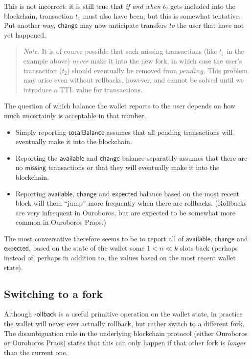 \documentclass{article}
\begin{document}
This is not incorrect: it is still true that \emph{if and when} $t_2$ gets
included into the blockchain, transaction $t_1$ must also have been; but this is
somewhat tentative. Put another way, $\mathsf{change}$ may now anticipate
transfers \emph{to} the user that have not yet happened.

\begin{quote} \emph{Note.}
It is of course possible that such missing transactions (like $t_1$ in the
example above) \emph{never} make it into the new fork, in which case the user's
transaction ($t_2$) should eventually be removed from $\mathit{pending}$. This
problem may arise even without rollbacks, however, and cannot be solved until we
introduce a TTL value for transactions.
\end{quote}

The question of which balance the wallet reports to the user depends on how
much uncertainly is acceptable in that number.

\begin{itemize}
\item Simply reporting $\mathsf{totalBalance}$ assumes that all pending
transactions will eventually make it into the blockchain.
\item Reporting the $\mathsf{available}$ and $\mathsf{change}$ balance separately
assumes that there are no $\mathsf{missing}$ transactions or that they will
eventually make it into the blockchain.
\item Reporting $\mathsf{available}$, $\mathsf{change}$ and $\mathsf{expected}$
balance based on the most recent block will them ``jump'' more frequently
when there are rollbacks. (Rollbacks are very infrequent in Ouroboros,
but are expected to be somewhat more common in Ouroboros Praos.)
\end{itemize}

The most conversative therefore seems to be to report all of
$\mathsf{available}$, $\mathsf{change}$ and $\mathsf{expected}$, based on the
state of the wallet some $1 < n \ll k$ slots back (perhaps instead of,
perhaps in addition to, the values based on the most recent wallet state).

\subsection{Switching to a fork}

Although $\mathsf{rollback}$ is a useful primitive operation on the wallet
state, in practice the wallet will never ever actually rollback, but rather
switch to a different fork. The disambiguation rule in the underlying blockchain
protocol (either Ouroboros or Ouroboros Praos) states that this can only happen
if that other fork is \emph{longer} than the current one.
\end{document}
